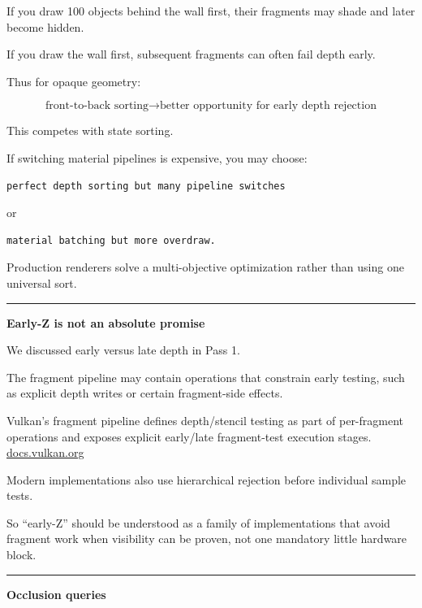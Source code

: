 If you draw 100 objects behind the wall first, their fragments may shade and later become hidden.

If you draw the wall first, subsequent fragments can often fail depth early.

Thus for opaque geometry:

\[
\boxed{
\text{front-to-back sorting}
\rightarrow
\text{better opportunity for early depth rejection}
}
\]

This competes with state sorting.

If switching material pipelines is expensive, you may choose:

\begin{verbatim}
perfect depth sorting but many pipeline switches
\end{verbatim}

or

\begin{verbatim}
material batching but more overdraw.
\end{verbatim}

Production renderers solve a multi-objective optimization rather than using one universal sort.

\begin{center}\rule{0.5\linewidth}{0.5pt}\end{center}

\textbf{Early-Z is not an absolute promise}

We discussed early versus late depth in Pass 1.

The fragment pipeline may contain operations that constrain early testing, such as explicit depth writes or certain fragment-side effects.

Vulkan's fragment pipeline defines depth/stencil testing as part of per-fragment operations and exposes explicit early/late fragment-test execution stages. \href{https://docs.vulkan.org/spec/latest/chapters/fragops.html?utm_source=chatgpt.com}{docs.vulkan.org}

Modern implementations also use hierarchical rejection before individual sample tests.

So ``early-Z'' should be understood as a family of implementations that avoid fragment work when visibility can be proven, not one mandatory little hardware block.

\begin{center}\rule{0.5\linewidth}{0.5pt}\end{center}

\textbf{Occlusion queries}

